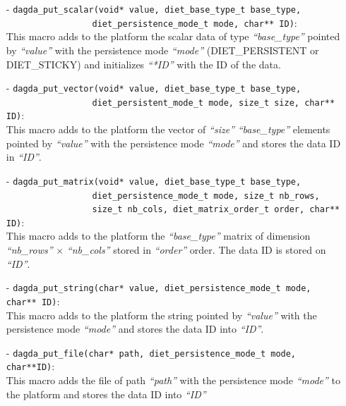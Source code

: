 \begin{itemize}
  \item[-] \verb#dagda_put_scalar(void* value, diet_base_type_t base_type,#\\
           \verb#                 diet_persistence_mode_t mode, char** ID)#:\\
           This macro adds to the platform the scalar data of type
           \textit{``base\_type''} pointed by \textit{``value''} with the
           persistence mode \textit{``mode''} (DIET\_PERSISTENT or DIET\_STICKY)
           and initializes \textit{``*ID''} with the ID of the data.
  \item[-] \verb#dagda_put_vector(void* value, diet_base_type_t base_type,#\\
           \verb#                 diet_persistent_mode_t mode, size_t size, char** ID)#:\\
           This macro adds to the platform the vector of \textit{``size''}
           \textit{``base\_type''} elements pointed by \textit{``value''} with the
           persistence mode \textit{``mode''} and stores the data ID in
           \textit{``ID''}.
  \item[-] \verb#dagda_put_matrix(void* value, diet_base_type_t base_type,#\\
         \verb#                 diet_persistence_mode_t mode, size_t nb_rows,#\\
         \verb#                 size_t nb_cols, diet_matrix_order_t order, char** ID)#:\\
           This macro adds to the platform the \textit{``base\_type''} matrix of
           dimension \textit{``nb\_rows''} $\times$ \textit{``nb\_cols''} stored in
           \textit{``order''} order. The data ID is stored on \textit{``ID''}.
  \item[-] \verb#dagda_put_string(char* value, diet_persistence_mode_t mode, char** ID)#:\\
           This macro adds to the platform the string pointed by
           \textit{``value''} with the persistence mode \textit{``mode''} and
           stores the data ID into \textit{``ID''}.
  \item[-] \verb#dagda_put_file(char* path, diet_persistence_mode_t mode, char**ID)#:\\
           This macro adds the file of path \textit{``path''} with the persistence
           mode \textit{``mode''} to the platform and stores the data ID into
           \textit{``ID''}
 \end{itemize}

